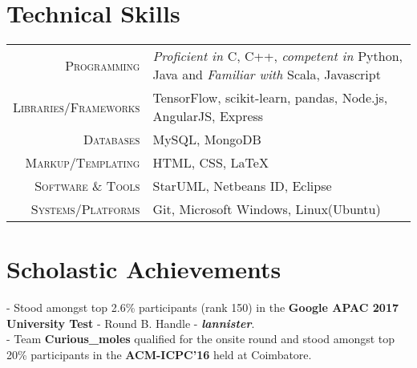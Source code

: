 \documentclass[a4paper,10pt]{extarticle} %
\begin{document}

\section{\large{Technical Skills}}

\begin{tabular}{r|p{16cm}}
\textsc{\normalsize{Programming}} 
& {\itshape{\small{Proficient in }}} \small{C, C++, }{\itshape{\small{competent in }}} \small{Python, Java and }{\itshape{\small{Familiar with }}} \small{{Scala, Javascript}} \\
\textsc{\normalsize{Libraries/Frameworks}} & \small{TensorFlow, scikit-learn, pandas, Node.js, AngularJS, Express}\\
\textsc{\normalsize{Databases}} & \small{MySQL, MongoDB}\\
\textsc{\normalsize{Markup/Templating}} & \small{HTML, CSS, \LaTeX}\\
\textsc{\normalsize{Software \& Tools}} & \small{StarUML, Netbeans ID, Eclipse}\\
\textsc{\normalsize{Systems/Platforms}} & \small{Git, Microsoft Windows, Linux(Ubuntu)}\\
\end{tabular}


\section{\large{Scholastic Achievements}}
\small{- Stood amongst top 2.6\% participants (rank 150) in the \textbf{Google APAC 2017 University Test} - Round B. Handle - \textbf{\textit{lannister}}}.\\
\small{- Team \textbf{\textbf{Curious\_moles}} qualified for the onsite round and stood amongst top 20\% participants in the \textbf{ACM-ICPC'16} held at Coimbatore.}



\end{document}
